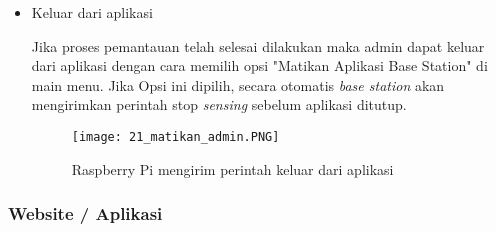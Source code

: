 \begin{itemize}
        \item Keluar dari aplikasi
        
        Jika proses pemantauan telah selesai dilakukan maka admin dapat keluar dari aplikasi dengan cara memilih opsi "Matikan Aplikasi Base Station" di main menu. Jika Opsi ini dipilih, secara otomatis \textit{base station} akan mengirimkan perintah stop \textit{sensing} sebelum aplikasi ditutup.
        
        \begin{figure}[H]
        	\centering  
        	\texttt{[image: 21\_matikan\_admin.PNG]}  
        	\caption[Raspberry Pi mengirim perintah keluar dari aplikasi]{Raspberry Pi mengirim perintah keluar dari aplikasi} 
        	\label{fig:Raspberry Pi mengirim perintah keluar dari aplikasi} 
        \end{figure}
        
        
    \end{itemize}
    
    
    \subsubsection{Website / Aplikasi}
    
